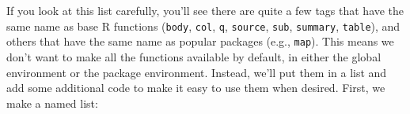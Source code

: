 \begin{Shaded}
\begin{Highlighting}[]
  \NormalTok{, }\NormalTok{, }\NormalTok{, }\NormalTok{, }\NormalTok{, }\NormalTok{, }
  \NormalTok{, }\NormalTok{, }\NormalTok{, }\NormalTok{, }\NormalTok{, }\NormalTok{, }\NormalTok{, }
  \NormalTok{, }\NormalTok{, }\NormalTok{, }\NormalTok{, }\NormalTok{, }\NormalTok{, }\NormalTok{,}
  \NormalTok{, }\NormalTok{, }\NormalTok{, }\NormalTok{)}

\StringTok{ }\NormalTok{(}\NormalTok{, }\NormalTok{, }\NormalTok{, }\NormalTok{, }\NormalTok{, }\NormalTok{,}
  \NormalTok{, }\NormalTok{, }\NormalTok{, }\NormalTok{, }\NormalTok{, }\NormalTok{, }\NormalTok{, }
  \NormalTok{, }\NormalTok{, }\NormalTok{)}
\end{Highlighting}
\end{Shaded}

If you look at this list carefully, you'll see there are quite a few
tags that have the same name as base R functions (\texttt{body},
\texttt{col}, \texttt{q}, \texttt{source}, \texttt{sub},
\texttt{summary}, \texttt{table}), and others that have the same name as
popular packages (e.g., \texttt{map}). This means we don't want to make
all the functions available by default, in either the global environment
or the package environment. Instead, we'll put them in a list and add
some additional code to make it easy to use them when desired. First, we
make a named list:

\begin{Shaded}
\begin{Highlighting}[]
\StringTok{ }\NormalTok{(}
  \NormalTok{(}
  \NormalTok{(}
\NormalTok{)}
\end{Highlighting}
\end{Shaded}

